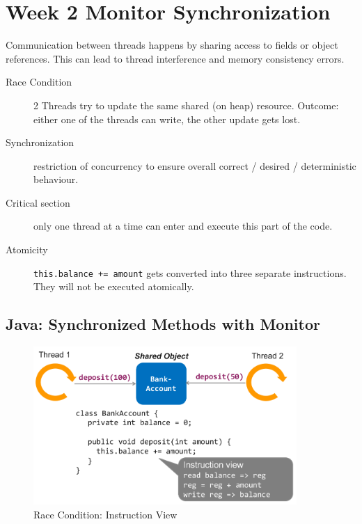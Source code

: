 \section{Week 2 Monitor Synchronization}

Communication between threads happens by sharing access to fields or object references. This can lead to thread interference and memory consistency errors. 

\begin{description}
  \item[Race Condition] 2 Threads try to update the same shared (on heap) resource. Outcome: either one of the threads can write, the other update gets lost.
  \item[Synchronization] restriction of concurrency to ensure overall correct / desired / deterministic behaviour.
  \item[Critical section] only one thread at a time can enter and execute this part of the code.
  \item[Atomicity] \verb|this.balance += amount| gets converted into three separate instructions. They will not be executed atomically.
\end{description}

\subsection{Java: Synchronized Methods with Monitor}

\begin{figure}
  \centering
  \includegraphics[width=10cm]{res/02-race-condition.png}
  \caption{Race Condition: Instruction View}
\end{figure}

